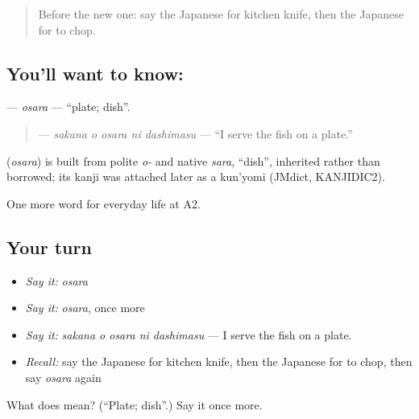 \label{lesson:JA-C174-osara}



\begin{quote}
Before the new one: say the Japanese for kitchen knife, then the Japanese for to chop.
\end{quote}

\subsection*{You'll want to know: }
\textbf{} — \emph{osara} — \textquotedblleft{}plate; dish\textquotedblright{}.

\begin{quote}
\textbf{  } — \emph{sakana o osara ni dashimasu} — \textquotedblleft{}I serve the fish on a plate.\textquotedblright{}
\end{quote}

\begin{cousinweb}
\textbf{} (\emph{osara}) is built from polite \emph{o-} and native \emph{sara}, \textquotedblleft{}dish\textquotedblright{}, inherited rather than borrowed; its kanji was attached later as a kun'yomi (JMdict, KANJIDIC2).
\end{cousinweb}

\begin{grammarlens}[title={What you've built}]
One more word for everyday life at A2.
\end{grammarlens}

\subsection*{Your turn}
\begin{itemize}
\raggedright
  \item \emph{Say it:} \emph{osara}
  \item \emph{Say it:} \emph{osara}, once more
  \item \emph{Say it:} \emph{sakana o osara ni dashimasu} — I serve the fish on a plate.
  \item \emph{Recall:} say the Japanese for kitchen knife, then the Japanese for to chop, then say \emph{osara} again
\end{itemize}

\begin{tcolorbox}[breakable,colback=teal!4,colframe=teal!35!black,title={Before you move on}]
What does  mean? (\textquotedblleft{}Plate; dish\textquotedblright{}.) Say it once more.
\end{tcolorbox}
